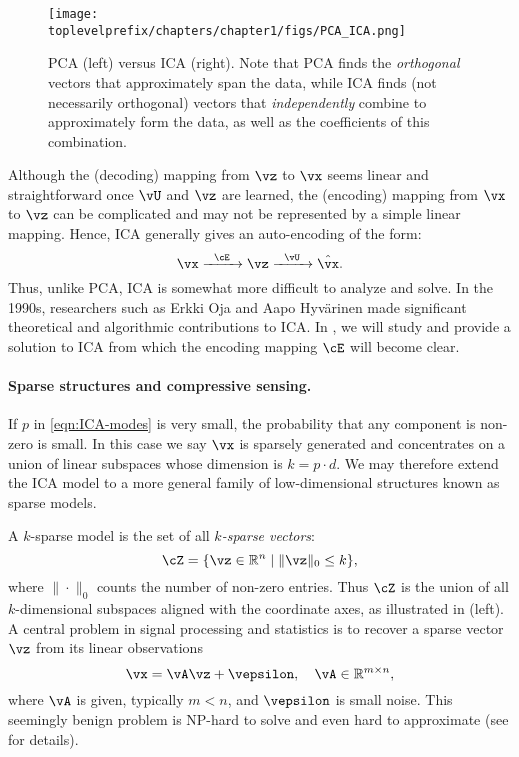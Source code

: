 \documentclass[../../book-main.tex]{subfiles}
\begin{document}
\begin{figure}
    \centering
    \texttt{[image: \\toplevelprefix/chapters/chapter1/figs/PCA\_ICA.png]}
    \caption{PCA (left) versus ICA (right). Note that PCA finds the \textit{orthogonal} vectors that approximately span the data, while ICA finds (not necessarily orthogonal) vectors that \textit{independently} combine to approximately form the data, as well as the coefficients of this combination.}
    \label{fig:ICA-PCA}
\end{figure}

Although the (decoding) mapping from \(\vz\) to \(\vx\) seems linear and straightforward once \(\vU\) and \(\vz\) are learned, the (encoding) mapping from \(\vx\) to \(\vz\) can be complicated and may not be represented by a simple linear mapping. Hence, ICA generally gives an auto-encoding of the form:
\begin{equation}
    \vx   \xrightarrow{\hspace{2mm} \cE\hspace{2mm}} \vz  \xrightarrow{\hspace{2mm} \vU \hspace{2mm}} \hat{\vx}.
       \label{eqn:auto-encoding-ICA}
\end{equation}
Thus, unlike PCA, ICA is somewhat more difficult to analyze and solve. In the 1990s, researchers such as Erkki Oja and Aapo Hyv\"{a}rinen \cite{hyvarinen-1997,Hyvrinen-2000} made significant theoretical and algorithmic contributions to ICA. In , we will study and provide a solution to ICA from which the encoding mapping \(\cE\) will become clear.


\paragraph{Sparse structures and compressive sensing.}
If \(p\) in \eqref{eqn:ICA-modes} is very small, the probability that any component is non-zero is small. In this case we say \(\vx\) is sparsely generated and concentrates on a union of linear subspaces whose dimension is \(k = p \cdot d\). We may therefore extend the ICA model to a more general family of low-dimensional structures known as sparse models.

A \(k\)-sparse model is the set of all \textit{\(k\)-sparse vectors}:
\begin{equation}
    \cZ = \{\vz \in \R^{n} \mid \|\vz\|_{0} \leq k\},
\end{equation}
where \(\|\cdot\|_{0}\) counts the number of non-zero entries. Thus \(\cZ\) is the union of all \(k\)-dimensional subspaces aligned with the coordinate axes, as illustrated in  (left). A central problem in signal processing and statistics is to recover a sparse vector \(\vz\) from its linear observations
\begin{equation}
    \vx = \vA \vz + \vepsilon, \quad \vA \in \R^{m\times n},
    \label{eqn:sparse-model}
\end{equation}
where \(\vA\) is given, typically \(m < n\), and \(\vepsilon\) is small noise. This seemingly benign problem is NP-hard to solve and even hard to approximate (see \cite{Wright-Ma-2022} for details).
\end{document}
